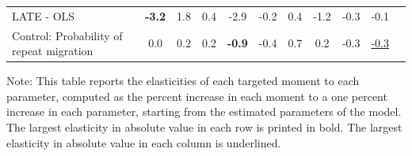 \documentclass[12pt,pdftex]{article}
\begin{document}
\begin{table}[!h]
\begin{center}
\begin{tabular}{l c c c c c c c c c c}
LATE - OLS & \textbf{-3.2} & 1.8 & 0.4 & -2.9 & -0.2 & 0.4 & -1.2 & -0.3 & -0.1 \\

Control: Probability of repeat migration & 0.0 & 0.2 & 0.2 & \textbf{-0.9} & -0.4 & 0.7 & 0.2 & -0.3 & \underline{-0.3} \\

\hline \hline

\end{tabular}
\parbox[c]{6.6in}{%
{\footnotesize  \vspace{0.5cm} Note: This table reports the elasticities of each targeted moment to each parameter, computed as the percent increase in each moment to a one percent increase in each parameter, starting from the estimated parameters of the model. The largest elasticity in absolute value in each row is printed in bold. The largest elasticity in absolute value in each column is underlined.}
}
\end{center}
\end{table}





\end{document}
